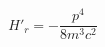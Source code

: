 \begin{issues}
\issueTODO
\end{issues}

\begin{equation}
H'_r = -\frac{p^4}{8m^3 c^2}
\end{equation}

